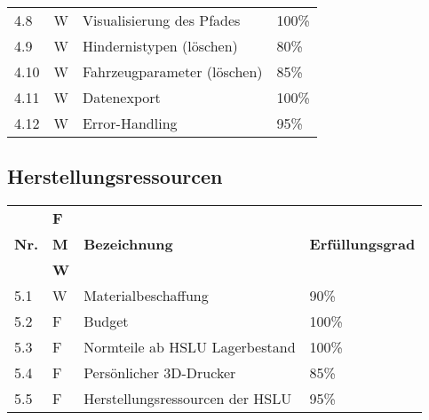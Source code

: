 \documentclass[main.tex]{subfiles} %
\begin{document}
\begin{tabular}{|l|p{0.5cm}|p{4cm}|p{10cm}|}
  4.8          & W              & Visualisierung des Pfades    & 100\%                    \\
  4.9          & W              & Hindernistypen (löschen)               & 80\%                    \\
  4.10          & W              & Fahrzeugparameter (löschen)            & 85\%                    \\
  4.11         & W              & Datenexport                  & 100\%                    \\
  4.12         & W              & Error-Handling               & 95\%                    \\
  \hline
\end{tabular}

\subsection*{Herstellungsressourcen}

\begin{tabular}{|l|p{0.5cm}|p{4cm}|p{10cm}|}
  \hline
               & \textbf{F} &                                  &                                                                                                                                                                                                                                                                                                                                                                                 \\
  \textbf{Nr.} & \textbf{M} & \textbf{Bezeichnung}             & \textbf{Erfüllungsgrad}                                                                                                                                                                                                                                                                                                                                                                                \\
               & \textbf{W} &                                  &                                                                                                                                                                                                                                                                                                                                                                         \\
  \hline
  5.1          & W              & Materialbeschaffung          & 90\%                    \\
  5.2          & F              & Budget                       & 100\%                   \\
  5.3          & F              & Normteile ab HSLU Lagerbestand & 100\%                 \\
  5.4          & F              & Persönlicher 3D-Drucker      & 85\%                    \\
  5.5          & F              & Herstellungsressourcen der HSLU & 95\%                  \\
  \hline
\end{tabular}


\newpage
\end{document}
